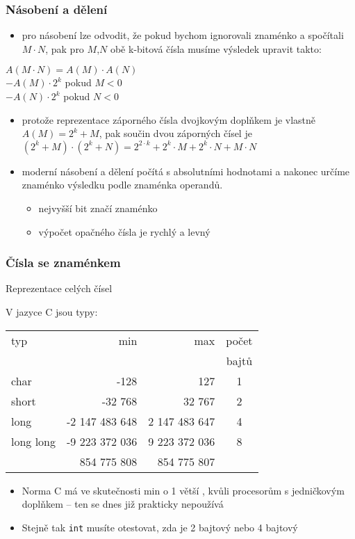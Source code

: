 \documentclass{beamer}
\begin{document}
\begin{frame}
\frametitle{Násobení a dělení}

\begin{itemize}
\item pro násobení lze odvodit, že pokud bychom ignorovali znaménko a spočítali $M\cdot N$, pak pro $M$,$N$ obě k-bitová čísla musíme výsledek upravit takto:
\end{itemize}
$A(M\cdot N) = A(M) \cdot A(N)$\\
\phantom{$A(M\cdot N)$ }$-A(M) \cdot 2^k$ \phantom{xxxxx} pokud $M<0$\\
\phantom{$A(M\cdot N)$ }$-A(N) \cdot 2^k$ \phantom{xxxxx} pokud $N<0$
\begin{itemize}
\item protože reprezentace záporného čísla dvojkovým doplňkem je vlastně $A(M) = 2^k+M$, pak součin dvou záporných čísel je $(2^k+M)\cdot (2^k+N) = 2^{2\cdot k}+2^k \cdot M + 2^k \cdot N + M \cdot N$
\end{itemize}
\begin{itemize}
\item moderní násobení a dělení počítá s absolutními hodnotami a nakonec určíme znaménko výsledku podle znaménka operandů.
\begin{itemize}
\item nejvyšší bit značí znaménko
\item výpočet opačného čísla je rychlý a levný
\end{itemize}
\end{itemize}
\end{frame}


\begin{frame}
\frametitle{Čísla se znaménkem}
Reprezentace celých čísel

V jazyce C jsou typy:
\begin{tabular}{|l|r|r|c|}\hline
typ & min & max & počet\\
 &  & &  bajtů\\ \hline
char & -128 & 127 & 1 \\ \hline
short & -32 768 & 32 767 & 2 \\ \hline 
long & -2 147 483 648 & 2 147 483 647 & 4 \\ \hline
long long & -9 223 372 036 & 9 223 372 036  & 8 \\ 
 & \phantom{xx} 854 775 808 & \phantom{xx}854 775 807 &  \\ \hline
\end{tabular}

\begin{itemize}
\item Norma C má ve skutečnosti min o 1 větší , kvůli procesorům s jedničkovým doplňkem -- ten se dnes již prakticky nepoužívá
\item Stejně tak \texttt{int} musíte otestovat, zda je 2 bajtový nebo 4 bajtový
\end{itemize}

\end{frame}
\end{document}

